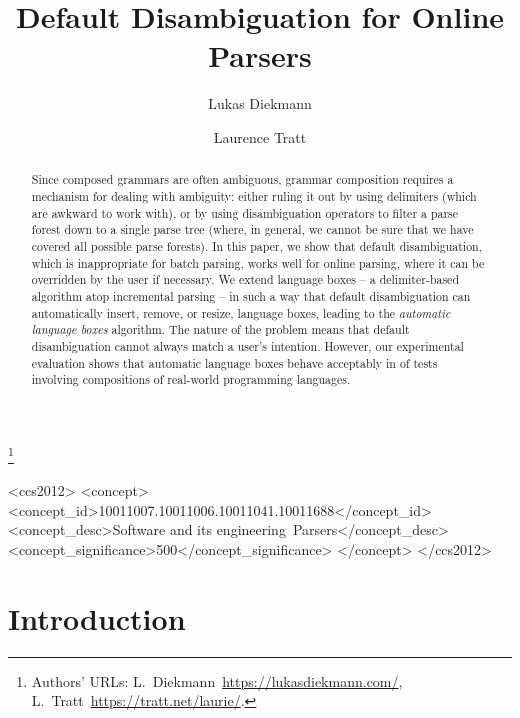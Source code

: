 \documentclass[sigplan,screen]{acmart}
\begin{document}
\title{Default Disambiguation for Online Parsers}

\author{Lukas Diekmann}
\author{Laurence Tratt}
\thanks{Authors' URLs: %
    L.~Diekmann~\url{https://lukasdiekmann.com/},
    L.~Tratt~\url{https://tratt.net/laurie/}.
}


\begin{abstract}
Since composed grammars are often ambiguous, grammar composition requires a
mechanism for dealing with ambiguity: either ruling it out by using
delimiters (which are awkward to work with), or by using disambiguation operators to
filter a parse forest down to a single parse tree (where, in general, we cannot
be sure that we have covered all possible parse forests). In this paper, we
show that default disambiguation, which is inappropriate for
batch parsing, works well for online parsing, where it can be overridden by the user if
necessary. We extend language boxes -- a delimiter-based
algorithm atop incremental parsing -- in such a way that default disambiguation
can automatically insert, remove, or resize, language boxes, leading to
the \emph{automatic language boxes} algorithm. The
nature of the problem means that default disambiguation
cannot always match a user's intention. However, our experimental
evaluation shows that automatic language boxes behave acceptably in \validalloverall of
tests involving compositions of real-world programming languages.
\end{abstract}

\begin{CCSXML}
<ccs2012>
<concept>
<concept_id>10011007.10011006.10011041.10011688</concept_id>
<concept_desc>Software and its engineering~Parsers</concept_desc>
<concept_significance>500</concept_significance>
</concept>
</ccs2012>
\end{CCSXML}


\maketitle

\section{Introduction}
\end{document}

